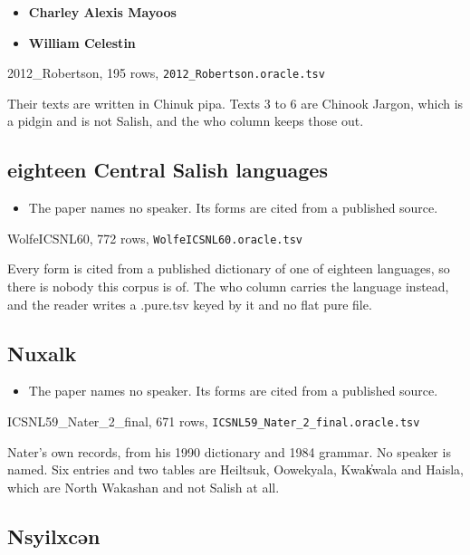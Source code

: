 \begin{itemize}
\item \textbf{Charley Alexis Mayoos}
\item \textbf{William Celestin}
\end{itemize}

2012\_Robertson, 195 rows, \texttt{2012\_\allowbreak{}Robertson.\allowbreak{}oracle.\allowbreak{}tsv}

Their texts are written in Chinuk pipa. Texts 3 to 6 are Chinook Jargon, which is a pidgin and is not Salish, and the who column keeps those out.

\subsection{eighteen Central Salish languages}

\begin{itemize}
\item The paper names no speaker. Its forms are cited from a published source.
\end{itemize}

WolfeICSNL60, 772 rows, \texttt{Wolfe\allowbreak{}ICSNL60.\allowbreak{}oracle.\allowbreak{}tsv}

Every form is cited from a published dictionary of one of eighteen languages, so there is nobody this corpus is of. The who column carries the language instead, and the reader writes a .pure.tsv keyed by it and no flat pure file.

\subsection{Nuxalk}

\begin{itemize}
\item The paper names no speaker. Its forms are cited from a published source.
\end{itemize}

ICSNL59\_Nater\_2\_final, 671 rows, \texttt{ICSNL59\_\allowbreak{}Nater\_\allowbreak{}2\_\allowbreak{}final.\allowbreak{}oracle.\allowbreak{}tsv}

Nater's own records, from his 1990 dictionary and 1984 grammar. No speaker is named. Six entries and two tables are Heiltsuk, Oowekyala, Kwak̓wala and Haisla, which are North Wakashan and not Salish at all.

\subsection{Nsyilxcən}

